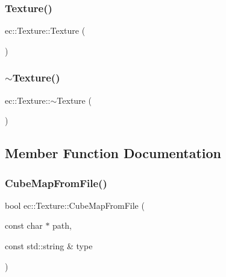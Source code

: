 \subsubsection{\texorpdfstring{Texture()}{Texture()}}
{\footnotesize\ttfamily ec\+::\+Texture\+::\+Texture (\begin{DoxyParamCaption}{ }\end{DoxyParamCaption})\hspace{0.3cm}{\ttfamily [explicit]}}

\mbox{\label{classec_1_1_texture_ae567d80654dd09c6b02a38ca8de29ead}} 
\subsubsection{\texorpdfstring{$\sim$\+Texture()}{~Texture()}}
{\footnotesize\ttfamily ec\+::\+Texture\+::$\sim$\+Texture (\begin{DoxyParamCaption}{ }\end{DoxyParamCaption})}



\subsection{Member Function Documentation}
\mbox{\label{classec_1_1_texture_a4ddfae4d7a899f946f3453ecf3652d51}} 
\subsubsection{\texorpdfstring{Cube\+Map\+From\+File()}{CubeMapFromFile()}}
{\footnotesize\ttfamily bool ec\+::\+Texture\+::\+Cube\+Map\+From\+File (\begin{DoxyParamCaption}\item[{const char $\ast$}]{path,  }\item[{const std\+::string \&}]{type }\end{DoxyParamCaption})}

\mbox{\label{classec_1_1_texture_aea77869bff55578f0e8c65f58354e191}} 
